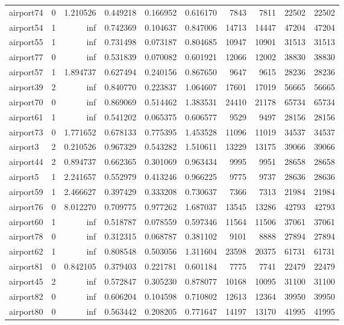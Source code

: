 \begin{longtable}{|l|r|r|r|r|r|r|r|r|r|}
airport74 & 0 & 1.210526 & 0.449218 & 0.166952 & 0.616170 & 7843 & 7811 & 22502 & 22502 \\
airport54 & 1 & inf & 0.742369 & 0.104637 & 0.847006 & 14713 & 14447 & 47204 & 47204 \\
airport55 & 1 & inf & 0.731498 & 0.073187 & 0.804685 & 10947 & 10901 & 31513 & 31513 \\
airport77 & 0 & inf & 0.531839 & 0.070082 & 0.601921 & 12066 & 12002 & 38830 & 38830 \\
airport57 & 1 & 1.894737 & 0.627494 & 0.240156 & 0.867650 & 9647 & 9615 & 28236 & 28236 \\
airport39 & 2 & inf & 0.840770 & 0.223837 & 1.064607 & 17601 & 17019 & 56665 & 56665 \\
airport70 & 0 & inf & 0.869069 & 0.514462 & 1.383531 & 24410 & 21178 & 65734 & 65734 \\
airport61 & 1 & inf & 0.541202 & 0.065375 & 0.606577 & 9529 & 9497 & 28156 & 28156 \\
airport73 & 0 & 1.771652 & 0.678133 & 0.775395 & 1.453528 & 11096 & 11019 & 34537 & 34537 \\
airport3 & 2 & 0.210526 & 0.967329 & 0.543282 & 1.510611 & 13229 & 13175 & 39066 & 39066 \\
airport44 & 2 & 0.894737 & 0.662365 & 0.301069 & 0.963434 & 9995 & 9951 & 28658 & 28658 \\
airport5 & 1 & 2.241657 & 0.552979 & 0.413246 & 0.966225 & 9775 & 9737 & 28636 & 28636 \\
airport59 & 1 & 2.466627 & 0.397429 & 0.333208 & 0.730637 & 7366 & 7313 & 21984 & 21984 \\
airport76 & 0 & 8.012270 & 0.709775 & 0.977262 & 1.687037 & 13545 & 13286 & 42793 & 42793 \\
airport60 & 1 & inf & 0.518787 & 0.078559 & 0.597346 & 11564 & 11506 & 37061 & 37061 \\
airport78 & 0 & inf & 0.312315 & 0.068787 & 0.381102 & 9101 & 8888 & 27894 & 27894 \\
airport62 & 1 & inf & 0.808548 & 0.503056 & 1.311604 & 23598 & 20375 & 61731 & 61731 \\
airport81 & 0 & 0.842105 & 0.379403 & 0.221781 & 0.601184 & 7775 & 7741 & 22479 & 22479 \\
airport45 & 2 & inf & 0.572847 & 0.305230 & 0.878077 & 10168 & 10095 & 31100 & 31100 \\
airport82 & 0 & inf & 0.606204 & 0.104598 & 0.710802 & 12613 & 12364 & 39950 & 39950 \\
airport80 & 0 & inf & 0.563442 & 0.208205 & 0.771647 & 14197 & 13170 & 41995 & 41995 \\

\end{longtable}
